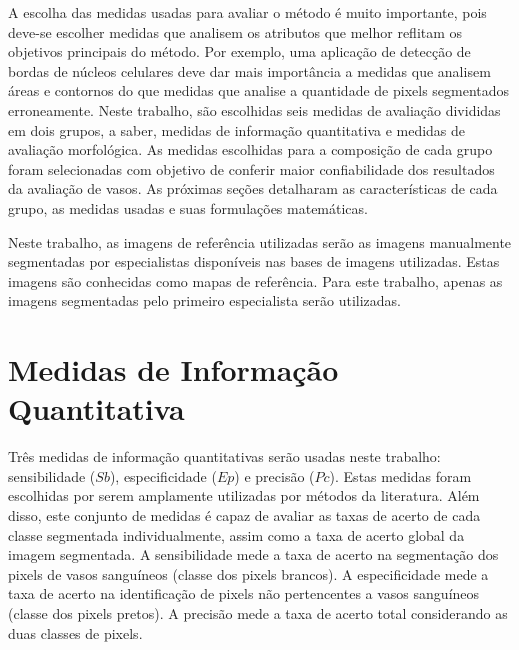 A escolha das medidas usadas para avaliar o m\'{e}todo \'{e} muito importante, pois deve-se escolher medidas que analisem os atributos que melhor reflitam os objetivos principais do m\'{e}todo. Por exemplo, uma aplica\c{c}\~{a}o de detec\c{c}\~{a}o de bordas de n\'{u}cleos celulares deve dar mais import\^{a}ncia a medidas que analisem \'{a}reas e contornos do que medidas que analise a quantidade de pixels segmentados erroneamente. Neste trabalho, s\~{a}o escolhidas seis medidas de avalia\c{c}\~{a}o divididas em dois grupos, a saber, medidas de informa\c{c}\~{a}o  quantitativa e medidas de avalia\c{c}\~{a}o morfol\'{o}gica. As medidas escolhidas para a composi\c{c}\~{a}o de cada grupo foram  selecionadas com objetivo de conferir maior confiabilidade dos resultados da avalia\c{c}\~{a}o de vasos. As pr\'{o}ximas se\c{c}\~{o}es detalharam as caracter\'{i}sticas de cada grupo, as medidas usadas e suas formula\c{c}\~{o}es matem\'{a}ticas.

Neste trabalho, as imagens de refer\^{e}ncia utilizadas ser\~{a}o as imagens manualmente segmentadas por especialistas dispon\'{i}veis nas bases de imagens utilizadas. Estas imagens s\~{a}o conhecidas como mapas de refer\^{e}ncia. Para este trabalho, apenas as imagens segmentadas pelo primeiro especialista ser\~{a}o utilizadas.

\section{Medidas de Informa\c{c}\~{a}o Quantitativa}

Tr\^{e}s medidas de informa\c{c}\~{a}o quantitativas ser\~{a}o usadas neste trabalho: sensibilidade ($Sb$), especificidade ($Ep$) e precis\~{a}o ($Pc$). Estas medidas foram escolhidas por serem amplamente utilizadas por m\'{e}todos da literatura. Al\'{e}m disso, este conjunto de medidas \'{e} capaz de avaliar as taxas de acerto de cada classe segmentada individualmente, assim como a taxa de acerto global da imagem segmentada. A sensibilidade mede a taxa de acerto na segmenta\c{c}\~{a}o dos pixels de vasos sangu\'{i}neos (classe dos pixels brancos). A especificidade mede a taxa de acerto na identifica\c{c}\~{a}o de pixels n\~{a}o pertencentes a vasos sangu\'{i}neos (classe dos pixels pretos). A precis\~{a}o mede a taxa de acerto total considerando as duas classes de pixels.

